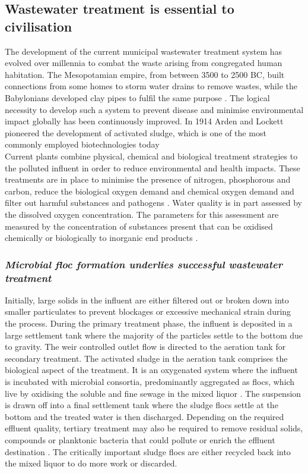 \documentclass[twoside]{article}
\begin{document}
\subsection{Wastewater treatment is essential to civilisation}
The development of the current municipal wastewater treatment system has evolved over millennia to combat the waste arising from congregated human habitation. The Mesopotamian empire, from between 3500 to 2500 BC, built connections from some homes to storm water drains to remove wastes, while the Babylonians developed clay pipes to fulfil the same purpose \cite{lofrano2010}. The logical necessity to develop such a system to prevent disease and minimise environmental impact globally has been continuously improved. In 1914 Arden and Lockett pioneered the development of activated sludge, which is one of the most commonly employed biotechnologies today \cite{jenkins2004manual,muchie2010bioremediation}\\


Current plants combine physical, chemical and biological treatment strategies to the polluted influent in order to reduce environmental and health impacts. These treatments are in place to minimise the presence of nitrogen, phosphorous and carbon, reduce the biological oxygen demand and chemical oxygen demand and filter out harmful substances and pathogens \cite{mayhew1997low}.
Water quality is in part assessed by the dissolved oxygen concentration. The parameters for this assessment are measured by the concentration of substances present that can be oxidised chemically or biologically to inorganic end products \cite{pisarevsky2005chemical}.

\subsubsection{\emph{Microbial floc formation underlies successful wastewater treatment}}
Initially, large solids in the influent are either filtered out or broken down into smaller particulates to prevent blockages or excessive mechanical strain during the process. During the primary treatment phase, the influent is deposited in a large settlement tank where the majority of the particles settle to the bottom due to gravity. The weir controlled outlet flow is directed to the aeration tank for secondary treatment. The activated sludge in the aeration tank comprises the biological aspect of the treatment. It is an oxygenated system where the influent is incubated with microbial consortia, predominantly aggregated as flocs, which live by oxidising the soluble and fine sewage in the mixed liquor \cite{mayhew1997low}. The suspension is drawn off into a final settlement tank where the sludge flocs settle at the bottom and the treated water is then discharged. Depending on the required effluent quality, tertiary treatment may also be required to remove residual solids, compounds or planktonic bacteria that could pollute or enrich the effluent destination \cite{Price_95}. The critically important sludge flocs are either recycled back into the mixed liquor to do more work or discarded.\\
\end{document}
